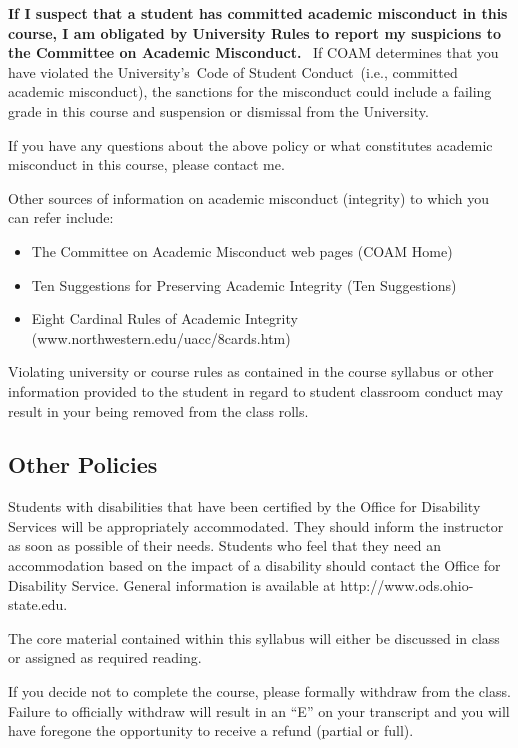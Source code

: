 \documentclass[12pt]{article}
\begin{document}
\textbf{If I suspect that a student has committed academic misconduct in this course, I am obligated by University Rules to report my suspicions to the Committee on Academic Misconduct.} 
If COAM determines that you have violated the University’s Code of Student Conduct (i.e., committed academic misconduct), the sanctions for the misconduct could include a failing grade in this course and suspension or dismissal from the University.

If you have any questions about the above policy or what constitutes academic misconduct in this course, please contact me.

Other sources of information on academic misconduct (integrity) to which you can refer include:
\begin{itemize}
    \item The Committee on Academic Misconduct web pages (COAM Home)
    \item Ten Suggestions for Preserving Academic Integrity (Ten Suggestions)
    \item Eight Cardinal Rules of Academic Integrity (www.northwestern.edu/uacc/8cards.htm)
\end{itemize}

Violating university or course rules as contained in the course syllabus or other information provided to the student in regard to student classroom conduct may result in your being removed from the class rolls.

\subsection*{Other Policies}

Students with disabilities that have been certified by the Office for Disability Services will be appropriately accommodated.
They should inform the instructor as soon as possible of their needs.
Students who feel that they need an accommodation based on the impact of a disability should contact the Office for Disability Service.
General information is available at http://www.ods.ohio-state.edu.

The core material contained within this syllabus will either be discussed in class or assigned as required reading.

If you decide not to complete the course, please formally withdraw from the class.
Failure to officially withdraw will result in an ``E'' on your transcript and you will have foregone the opportunity to receive a refund (partial or full).
\end{document}
